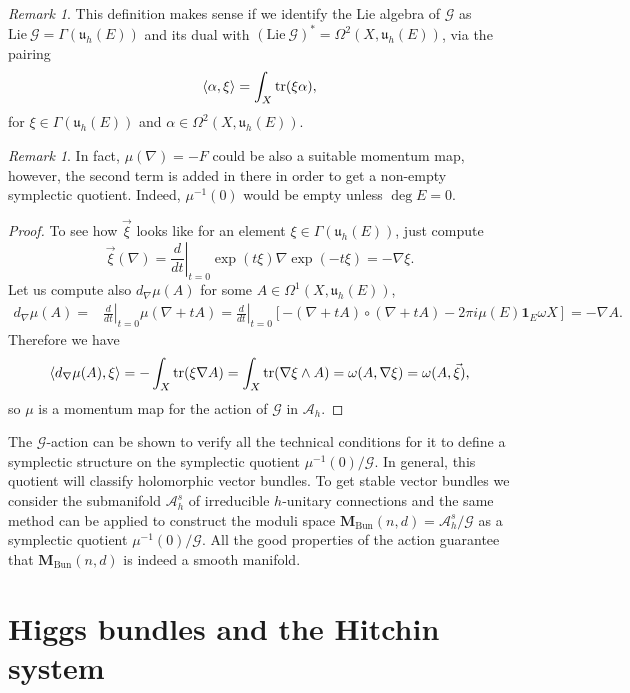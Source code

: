 \documentclass[12pt,a4paper]{book}
\theoremstyle{definition} \newtheorem{defn}[thm]{Definition}
\theoremstyle{definition} \newtheorem{ejemplo}[thm]{Example}
\theoremstyle{remark} \newtheorem{rem}[thm]{Remark}
\def\AA{\mathscr{A}}
\def\GG{\mathscr{G}}
\def\tr{\mathrm{tr}}
\def\id{\mathbf{1}}
\def\Lie{\mathrm{Lie}}
\def\uu{\mathfrak{u}}
\def\Bun{\mathbf{M}_{\mathrm{Bun}}}
\let\emph\relax
\DeclarePairedDelimiter\esc{\langle}{\rangle}
\begin{document}
\begin{rem}
This definition makes sense if we identify the Lie algebra of $\GG$ as $\Lie\ \GG= \Gamma(\uu_h(E))$ and its dual with $(\Lie\ \GG)^*=\Omega^2(X,\uu_h(E))$, via the pairing
\begin{equation*}
  \esc{\alpha,\xi}=\int_X \tr(\xi \alpha),
\end{equation*}
for $\xi \in \Gamma(\uu_h(E))$ and $\alpha \in \Omega^2(X,\uu_h(E))$.
\end{rem}
\begin{rem}
In fact, $\mu(\nabla)=-F$ could be also a suitable momentum map, however, the second term is added in there in order to get a non-empty symplectic quotient. Indeed, $\mu^{-1}(0)$ would be empty unless $\deg E=0$.
\end{rem}
\begin{proof}
To see how $\vec{\xi}$ looks like for an element $\xi \in \Gamma(\uu_h(E))$, just compute
\begin{equation*}
  \vec{\xi}(\nabla)=\left.\frac{d}{dt}\right|_{t=0} \exp(t\xi)\nabla \exp(-t\xi)= -\nabla \xi.
\end{equation*}
Let us compute also $d_\nabla \mu (A)$ for some $A \in \Omega^1(X,\uu_h(E))$,
\begin{align*}
  d_\nabla \mu (A) =& \left.\frac{d}{dt} \right|_{t=0} \mu(\nabla + tA)=\left.\frac{d}{dt} \right|_{t=0} [-(\nabla +tA) \circ (\nabla + tA) -2\pi i \mu(E) \id_E \omega X ] = -\nabla A.
\end{align*}
Therefore we have
\begin{align*}
  \esc{d_\nabla \mu(A), \xi}=-\int_X \tr(\xi \nabla A) = \int_X \tr(\nabla \xi \wedge A) = \omega(A,\nabla \xi)=\omega(A,\vec{\xi}),
\end{align*}
so $\mu$ is a momentum map for the action of $\GG$ in $\AA_h$. 
\end{proof}

The $\GG$-action can be shown to verify all the technical conditions for it to define a symplectic structure on the symplectic quotient $\mu^{-1}(0)/\GG$. In general, this quotient will classify \emph{polystable} holomorphic vector bundles. To get stable vector bundles we consider the submanifold $\AA^s_h$ of irreducible $h$-unitary connections and the same method can be applied to construct the moduli space $\Bun(n,d)=\AA^s_h/\GG$ as a symplectic quotient $\mu^{-1}(0)/\GG$. All the good properties of the action guarantee that $\Bun(n,d)$ is indeed a smooth manifold.

\chapter{Higgs bundles and the Hitchin system}
\end{document}
